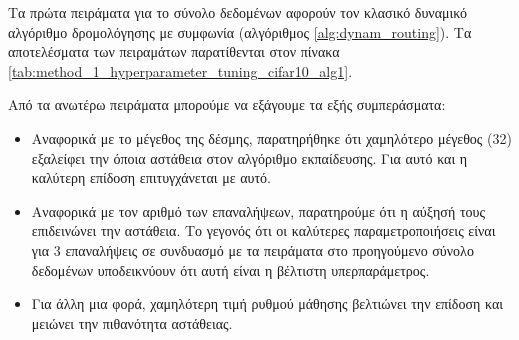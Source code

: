 Τα πρώτα πειράματα για το σύνολο δεδομένων  αφορούν τον κλασικό δυναμικό αλγόριθμο δρομολόγησης με συμφωνία (αλγόριθμος \ref{alg:dynam_routing}). Τα αποτελέσματα των πειραμάτων παρατίθενται στον πίνακα \ref{tab:method_1_hyperparameter_tuning_cifar10_alg1}.
\begin{table}[h]
    \begin{center}
    \end{center}
    \caption[]{\label{tab:method_1_hyperparameter_tuning_cifar10_alg1}Πειράματα στο  για την αναζήτηση υπερπαραμέτρων στον αλγόριθμο δυναμικής δρομολόγησης με συμφωνία (αλγόριθμος \ref{alg:dynam_routing}) για 30 εποχές. Οι αριθμοί με αστερίσκο αναφέρονται σε περιπτώσεις αστάθειας του αλγορίθμου εκπαίδευσης.}
\end{table}

Από τα ανωτέρω πειράματα μπορούμε να εξάγουμε τα εξής συμπεράσματα:
\begin{itemize}
    \item Αναφορικά με το μέγεθος της δέσμης, παρατηρήθηκε ότι χαμηλότερο μέγεθος (32) εξαλείφει την όποια αστάθεια στον αλγόριθμο εκπαίδευσης. Για αυτό και η καλύτερη επίδοση επιτυγχάνεται με αυτό.
    \item Αναφορικά με τον αριθμό των επαναλήψεων, παρατηρούμε ότι η αύξησή τους επιδεινώνει την αστάθεια. Το γεγονός ότι οι καλύτερες παραμετροποιήσεις είναι για 3 επαναλήψεις σε συνδυασμό με τα πειράματα στο προηγούμενο σύνολο δεδομένων υποδεικνύουν ότι αυτή είναι η βέλτιστη υπερπαράμετρος.
    \item Για άλλη μια φορά, χαμηλότερη τιμή ρυθμού μάθησης βελτιώνει την επίδοση και μειώνει την πιθανότητα αστάθειας.
\end{itemize}


